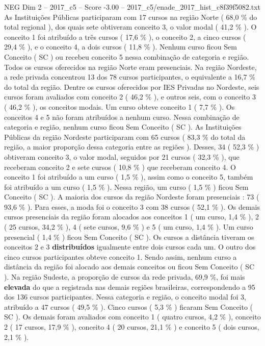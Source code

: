 \begin{textsample}{NEG Dim 2 – 2017\_c5 – Score -3.00 – 2017\_c5/enade\_2017\_hist\_c8f39f5082.txt}
As Instituições Públicas participaram com 17 cursos na região Norte ( 68,0 \% do total regional ), dos quais sete obtiveram conceito 3, o valor modal ( 41,2 \% ).
O conceito 1 foi atribuído a três cursos ( 17,6 \% ), o conceito 2, a cinco cursos ( 29,4 \% ), e o conceito 4, a dois cursos ( 11,8 \% ).
Nenhum curso ficou Sem Conceito ( SC ) ou recebeu conceito 5 nessa combinação de categoria e região.
Todos os cursos oferecidos na região Norte eram presenciais.
Na região Nordeste, a rede privada concentrou 13 dos 78 cursos participantes, o equivalente a 16,7 \% do total da região.
Dentre os cursos oferecidos por IES Privadas no Nordeste, seis cursos foram avaliados com conceito 2 ( 46,2 \% ), e outros seis, com o conceito 3 ( 46,2 \% ), os conceitos modais.
Um curso obteve conceito 1 ( 7,7 \% ).
Os conceitos 4 e 5 não foram atribuídos a nenhum curso.
Nessa combinação de categoria e região, nenhum curso ficou Sem Conceito ( SC ).
As Instituições Públicas da região Nordeste participaram com 65 cursos ( 83,3 \% do total da região, a maior proporção dessa categoria entre as regiões ).
Desses, 34 ( 52,3 \% ) obtiveram conceito 3, o valor modal, seguidos por 21 cursos ( 32,3 \% ), que receberam conceito 2 e sete cursos ( 10,8 \% ) que receberam conceito 4.
O conceito 1 foi atribuído a um curso ( 1,5 \% ), assim como o conceito 5, também foi atribuído a um curso ( 1,5 \% ).
Nessa região, um curso ( 1,5 \% ) ficou Sem Conceito ( SC ).
A maioria dos cursos da região Nordeste foram presenciais : 73 ( 93,6 \% ).
Para esses, a moda foi o conceito 3 com 38 cursos ( 52,1 \% ).
Os demais cursos presenciais da região foram alocados aos conceitos 1 ( um curso, 1,4 \% ), 2 ( 25 cursos, 34,2 \% ), 4 ( sete cursos, 9,6 \% ) e 5 ( um curso, 1,4 \% ).
Um curso presencial ( 1,4 \% ) ficou Sem Conceito ( SC ).
Os cursos a distância tiveram os conceitos 2 e 3 \textbf{distribuídos} igualmente entre dois cursos cada um.
O outro dos cinco cursos participantes obteve conceito 1.
Sendo assim, nenhum curso a distância da região foi alocado aos demais conceitos ou ficou Sem Conceito ( SC ).
Na região Sudeste, a proporção de cursos da rede privada, 69,9 \%, foi mais \textbf{elevada} do que a registrada nas demais regiões brasileiras, correspondendo a 95 dos 136 cursos participantes.
Nessa categoria e região, o conceito modal foi 3, atribuído a 47 cursos ( 49,5 \% ).
Cinco cursos ( 5,3 \% ) ficaram Sem Conceito ( SC ).
Os demais foram avaliados com conceito 1 ( quatro cursos, 4,2 \% ), conceito 2 ( 17 cursos, 17,9 \% ), conceito 4 ( 20 cursos, 21,1 \% ) e conceito 5 ( dois cursos, 2,1 \% ).

\end{textsample}
